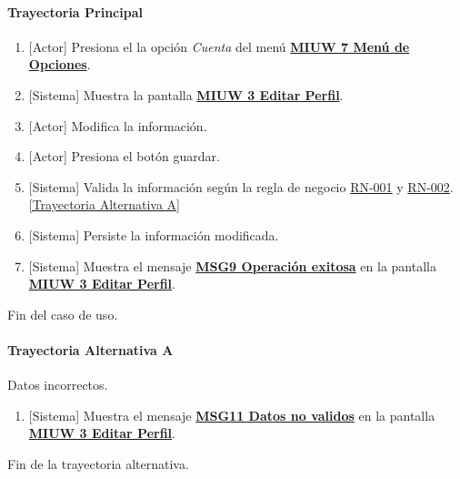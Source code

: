 \paragraph{Trayectoria Principal}
	\begin{enumerate}
	    \item {[Actor]} Presiona el la opción \textit{Cuenta} del menú \hyperref[fig:MIUW-7]{\bf MIUW 7 Menú de Opciones}.
	    \item {[Sistema]} Muestra la pantalla  \hyperref[fig:MIUW-3]{\bf MIUW 3 Editar Perfil}.
	    \item {[Actor]} Modifica la información.
	    \item {[Actor]} Presiona el botón guardar.
	    \item {[Sistema]} Valida la información según la regla de negocio \hyperref[RN001]{RN-001} y \hyperref[RN002]{RN-002}. \hyperref[W-USR-CU4:TA]{[Trayectoria Alternativa A]}
	    \item {[Sistema]} Persiste la información modificada.
	    \item {[Sistema]} Muestra el mensaje \hyperref[MSG9]{\bf MSG9 Operación exitosa} en la pantalla \hyperref[fig:MIUW-3]{\bf MIUW 3 Editar Perfil}.
	\end{enumerate}
	Fin del caso de uso.

\paragraph{Trayectoria Alternativa A} \label{W-USR-CU4:TA}
	Datos incorrectos.
	\begin{enumerate}[label=A\arabic*.]
		\item {[Sistema]} Muestra el mensaje \hyperref[MSG1]{\bf MSG11 Datos no validos} en la pantalla \hyperref[fig:MIUW-3]{\bf MIUW 3 Editar Perfil}.
	\end{enumerate}
	Fin de la trayectoria alternativa.
